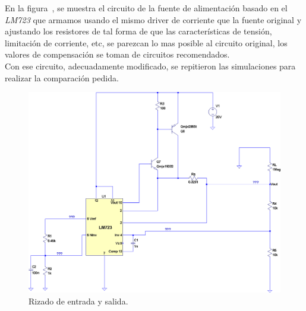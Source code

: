 \vspace{1.5cm}

En la figura~, se muestra el circuito de la fuente de alimentación basado en el \textit{LM723} que armamos usando el mismo driver de corriente que la fuente original y ajustando los resistores de tal forma de que las características de tensión, limitación de corriente, etc, se parezcan lo mas posible al circuito original, los valores de compensación se toman de circuitos recomendados.\\
Con ese circuito, adecuadamente modificado, se repitieron las simulaciones para realizar la comparación pedida.\\

\vfill


\clearpage

\begin{figure}[H] %
\begin{center}
\includegraphics[width=1.2 \textwidth, angle=90]{./img/preguntas/p21.png}
\caption{\label{fig:fig_p21}\footnotesize{Rizado de entrada y salida.}}
\end{center}
\end{figure}

\clearpage